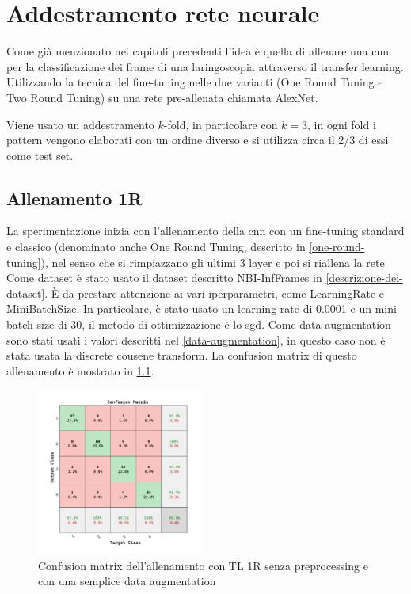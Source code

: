 \chapter{Addestramento rete neurale}\label{addestramento-rete-neurale}


Come già menzionato nei capitoli precedenti l’idea è quella di allenare una \gls{cnn} per la classificazione dei frame di una laringoscopia attraverso il transfer learning. Utilizzando la tecnica del
fine-tuning nelle due varianti (One Round Tuning e Two Round Tuning)  su una rete pre-allenata chiamata AlexNet.


Viene usato un addestramento \(k\)-fold, in particolare con \(k=3\), in ogni fold i  pattern vengono elaborati con un
ordine diverso e si utilizza circa il 2/3 di essi come test set.


\section{Allenamento 1R}\label{allenamento-1r}

La sperimentazione inizia con l'allenamento della \gls{cnn} con un fine-tuning standard e classico (denominato anche One Round Tuning, descritto in \cref{one-round-tuning}), nel senso che si rimpiazzano gli ultimi 3 layer e poi si riallena la rete. Come dataset è stato usato il dataset descritto NBI-InfFrames in \cref{descrizione-dei-dataset}. È da prestare attenzione ai vari iperparametri, come \Gls{LearningRate} e \Gls{MiniBatchSize}. In particolare, è stato usato un learning rate di 0.0001 e un mini batch size di 30, il metodo di ottimizzazione è lo \gls{sgd}. Come data augmentation sono stati usati i valori descritti nel \cref{data-augmentation}, in questo caso non è stata usata la discrete cousene transform. La confusion matrix di questo allenamento è mostrato in \cref{fig:result-one-liscio}.


\begin{figure}[H]
    \centering
    \includegraphics[width=0.49\textwidth]{addestramento-rete-neurale/one-liscio.pdf}
    \caption{Confusion matrix dell'allenamento con TL 1R senza preprocessing e con una semplice data augmentation}
    \label{fig:result-one-liscio}
\end{figure}


